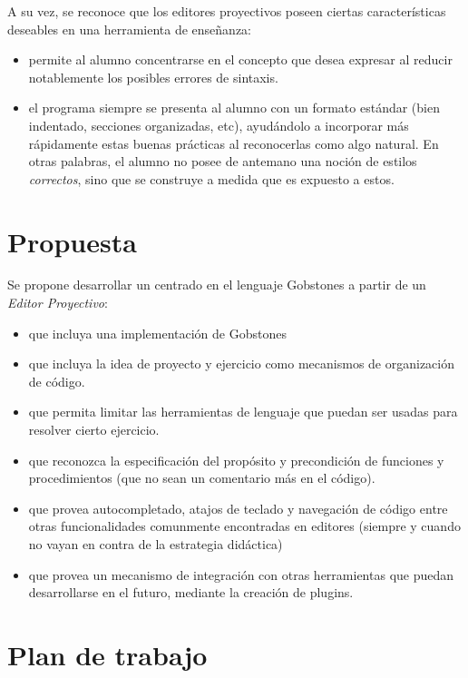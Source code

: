 A su vez, se reconoce que los editores proyectivos poseen ciertas características deseables en una herramienta de enseñanza:

\begin{itemize}
  \item permite al alumno concentrarse en el concepto que desea expresar al reducir notablemente los posibles errores de sintaxis.
  \item el programa siempre se presenta al alumno con un formato estándar (bien indentado, secciones organizadas, etc), ayudándolo a incorporar más rápidamente estas buenas prácticas al reconocerlas como algo natural. En otras palabras, el alumno no posee de antemano una noción de estilos \textit{correctos}, sino que se construye a medida que es expuesto a estos.
\end{itemize}


\section{Propuesta}

Se propone desarrollar un \ile centrado en el lenguaje Gobstones a partir de un \textit{Editor Proyectivo}:

\begin{itemize}
  \item que incluya una implementación de Gobstones
  \item que incluya la idea de proyecto y ejercicio como mecanismos de organización de código.
  \item que permita limitar las herramientas de lenguaje que puedan ser usadas para resolver cierto ejercicio.
  \item que reconozca la especificación del propósito y precondición de funciones y procedimientos (que no sean un comentario más en el código).
  \item que provea autocompletado, atajos de teclado y navegación de código entre otras funcionalidades comunmente encontradas en editores (siempre y cuando no vayan en contra de la estrategia didáctica)
  \item que provea un mecanismo de integración con otras herramientas que puedan desarrollarse en el futuro, mediante la creación de plugins.
\end{itemize}


\section{Plan de trabajo}

